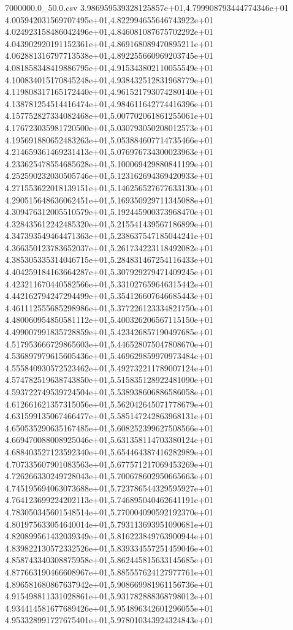 \begin{filecontents*}{7000000.0_50.0.csv}
3.986959539328125857e+01,4.799908793444774346e+01
4.005942031569707495e+01,4.822994655646743922e+01
4.024923158486042496e+01,4.846081087675702292e+01
4.043902920191152361e+01,4.869168089470895211e+01
4.062881316797713538e+01,4.892255660969203745e+01
4.081858348419886795e+01,4.915343802110055549e+01
4.100834015170845248e+01,4.938432512831968779e+01
4.119808317165172440e+01,4.961521793074280140e+01
4.138781254514416474e+01,4.984611642774416396e+01
4.157752827334082468e+01,5.007702061861255061e+01
4.176723035981720500e+01,5.030793050208012573e+01
4.195691880652483263e+01,5.053884607714735466e+01
4.214659361469231413e+01,5.076976734300023963e+01
4.233625478554685628e+01,5.100069429880841199e+01
4.252590232030505746e+01,5.123162694369420933e+01
4.271553622018139151e+01,5.146256527677633130e+01
4.290515648636062451e+01,5.169350929711345088e+01
4.309476312005510579e+01,5.192445900373968470e+01
4.328435612242485320e+01,5.215541439567186899e+01
4.347393549464471363e+01,5.238637547185044241e+01
4.366350123783652037e+01,5.261734223118492082e+01
4.385305335314046715e+01,5.284831467254116433e+01
4.404259184163664287e+01,5.307929279471409245e+01
4.423211670440582566e+01,5.331027659646315442e+01
4.442162794247294499e+01,5.354126607646685443e+01
4.461112555685298986e+01,5.377226123334821750e+01
4.480060954850581112e+01,5.400326206567115150e+01
4.499007991835728859e+01,5.423426857190497685e+01
4.517953666729865603e+01,5.446528075047808670e+01
4.536897979615605436e+01,5.469629859970973484e+01
4.555840930572523462e+01,5.492732211789007124e+01
4.574782519638743850e+01,5.515835128922481090e+01
4.593722749539724504e+01,5.538938606886586058e+01
4.612661621357315056e+01,5.562042645071778679e+01
4.631599135067466477e+01,5.585147242863968131e+01
4.650535290635167485e+01,5.608252399627508566e+01
4.669470088008925046e+01,5.631358114703380124e+01
4.688403527123592340e+01,5.654464387416282989e+01
4.707335607901083563e+01,5.677571217069453269e+01
4.726266330249728043e+01,5.700678602950665663e+01
4.745195694063073688e+01,5.723786544329595927e+01
4.764123699224202113e+01,5.746895040462641191e+01
4.783050345601548514e+01,5.770004090592192370e+01
4.801975633054640014e+01,5.793113693951090681e+01
4.820899561432039349e+01,5.816223849763900944e+01
4.839822130572332526e+01,5.839334557251459046e+01
4.858743340308875958e+01,5.862445815633145685e+01
4.877663190466608967e+01,5.885557624127977761e+01
4.896581680867637942e+01,5.908669981961156736e+01
4.915498811331028861e+01,5.931782888368798012e+01
4.934414581677689426e+01,5.954896342601296055e+01
4.953328991727675401e+01,5.978010343924324843e+01

\end{filecontents*}

